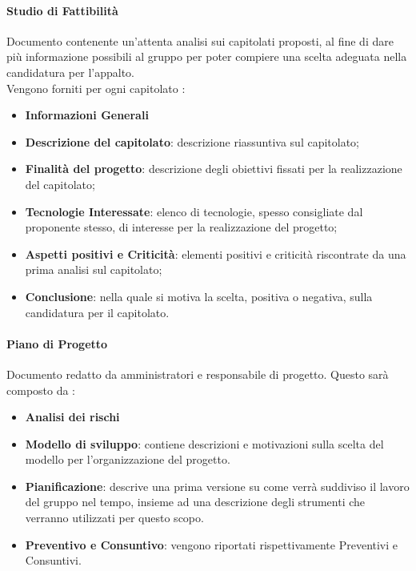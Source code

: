 		\paragraph{Studio di Fattibilità}  \hfill \break
	 		Documento contenente un'attenta analisi sui capitolati proposti, al fine di dare più informazione possibili al gruppo per poter compiere una scelta adeguata nella candidatura per l'appalto. \\
	 		Vengono forniti per ogni capitolato :
	 		\begin{itemize}
	 			\item \textbf{Informazioni Generali}
	 			\item \textbf{Descrizione del capitolato}: descrizione riassuntiva sul capitolato;
	 			\item \textbf{Finalità del progetto}: descrizione degli obiettivi fissati per la realizzazione del capitolato;
	 			\item \textbf{Tecnologie Interessate}: elenco di tecnologie, spesso consigliate dal proponente stesso, di interesse per la realizzazione del progetto;
	 			\item \textbf{Aspetti positivi e Criticità}: elementi positivi e criticità riscontrate da una prima analisi sul capitolato;
	 			\item \textbf{Conclusione}: nella quale si motiva la scelta, positiva o negativa, sulla candidatura per il capitolato.
	 		\end{itemize} 
 		
		\paragraph{Piano di Progetto}  \hfill \break
			Documento redatto da amministratori e responsabile di progetto. Questo sarà composto da :
			\begin{itemize}
				\item \textbf{Analisi dei rischi} %
				\item \textbf{Modello di sviluppo}: contiene descrizioni e motivazioni sulla scelta del modello per l'organizzazione del progetto.
				\item \textbf{Pianificazione}: descrive una prima versione su come verrà suddiviso il lavoro del gruppo nel tempo, insieme ad una descrizione degli strumenti che verranno utilizzati per questo scopo.
				\item \textbf{Preventivo e Consuntivo}: vengono riportati rispettivamente Preventivi e Consuntivi.
			\end{itemize}
	
